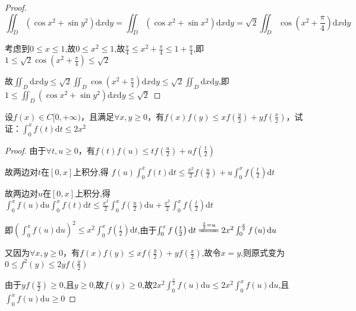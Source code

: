 \begin{xiti}
\begin{proof}
		\[\iint_{D}\left(\cos x^{2}+\sin y^{2}\right) \mathrm{d} x \mathrm{d} y = \iint_{D}\left(\cos x^{2}+\sin x^{2}\right) \mathrm{d} x \mathrm{d} y =\sqrt{2} \iint_{D} \cos \left(x^{2}+\frac{\pi}{4}\right) \mathrm{d} x \mathrm{d} y \]
		
		考虑到$0 \leqslant x \leqslant 1$,故$0 \leqslant x^{2} \leqslant 1$,故$\frac{\pi}{4} \leqslant x^{2}+\frac{\pi}{4} \leqslant 1+\frac{\pi}{4}$,即$1 \leqslant \sqrt{2} \cos \left(x^{2}+\frac{\pi}{4}\right) \leqslant \sqrt{2}$
		
		故$\iint_{D} \mathrm{d} x \mathrm{d} y \leqslant \sqrt{2} \iint_{D} \cos \left(x^{2}+\frac{\pi}{4}\right) \mathrm{d} x \mathrm{d} y \leqslant \sqrt{2} \iint_{D} \mathrm{d} x \mathrm{d} y$,即$1\leqslant \iint_{D}\left(\cos x^{2}+\sin y^{2}\right) \mathrm{d} x \mathrm{d} y \leqslant \sqrt{2}$
	\end{proof}
	\item 	设$f(x) \in C[0,+\infty)$，且满足$\forall x, y \geqslant 0$，有$f(x) f(y) \leqslant x f\left(\frac{y}{2}\right)+y f\left(\frac{x}{2}\right)$，试证：$\int_{0}^{x} f(t) \mathrm{d} t \leqslant 2 x^{2}$
	\begin{proof}
		由于$\forall t, u \geqslant 0$，有$f(t) f(u) \leqslant t f\left(\frac{u}{2}\right)+u f\left(\frac{t}{2}\right)$
		
		故两边对$t$在$[0,x]$上积分,得
		$f(u) \int_{0}^{x} f(t) \mathrm{d} t \leqslant \frac{x^{2}}{2} f\left(\frac{u}{2}\right) + u \int_{0}^{x} f\left(\frac{t}{2}\right) \mathrm{d} t$
		
		故两边对$u$在$[0,x]$上积分,得
		$\int_{0}^{x} f(u) \mathrm{d} u \int_{0}^{x} f(t) \mathrm{d} t \leqslant \frac{x^{2}}{2} \int_{0}^{x} f\left(\frac{u}{2}\right) \mathrm{d} u + \frac{x^{2}}{2} \int_{0}^{x} f\left(\frac{t}{2}\right) \mathrm{d} t $
		
		即$\left(\int_{0}^{x} f(u) \mathrm{d} u\right)^{2} \leqslant x^{2} \int_{0}^{x} f\left(\frac{t}{2}\right) \mathrm{d} t$,由于$\int_{0}^{x} f\left(\frac{t}{2}\right) \mathrm{d} t \xlongequal{\frac{t}{2}=u} 2x^{2}\int_{0}^{\frac{x}{2}} f\left(u\right) \mathrm{d} u$
		
		又因为$\forall x, y \geqslant 0$，有$f(x) f(y) \leqslant x f\left(\frac{y}{2}\right)+y f\left(\frac{x}{2}\right)$,故令$x=y$,则原式变为$0 \leqslant f^{2} (y) \leqslant 2 y f\left(\frac{y}{2}\right)$
		
		由于$yf\left(\frac{y}{2}\right) \geqslant 0$,且$y \geqslant 0$,故$f(y) \geqslant 0$,故$2x^{2}\int_{0}^{\frac{x}{2}} f\left(u\right) \mathrm{d} u \leqslant 2x^{2}\int_{0}^{x} f\left(u\right) \mathrm{d} u$,且$\int_{0}^{x} f\left(u\right) \mathrm{d} u \geqslant 0$
		

\end{proof}
\end{xiti}
